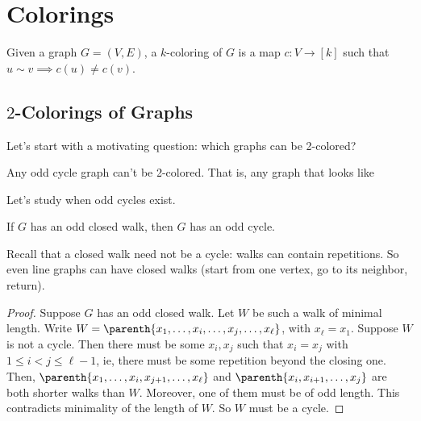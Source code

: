 \section{Colorings}

\begin{boxdefinition}[Coloring]
    Given a graph $G = (V, E)$, a $k$-coloring of $G$ is a map $c : V \to [k]$ such that $u \sim v \implies c(u) \ne c(v)$.
\end{boxdefinition}

\subsection{$2$-Colorings of Graphs}

Let's start with a motivating question: which graphs can be 2-colored?

Any odd cycle graph can't be 2-colored. That is, any graph that looks like
\begin{figure}[H]
    \centering
\end{figure}

Let's study when odd cycles exist.

\begin{boxlemma}\label{Ch2:Lemma:Odd_Closed_Walk}
    If $G$ has an odd closed walk, then $G$ has an odd cycle.
\end{boxlemma}
Recall that a closed walk need not be a cycle: walks can contain repetitions. So even line graphs can have closed walks (start from one vertex, go to its neighbor, return).
\begin{proof}
    Suppose $G$ has an odd closed walk. Let $W$ be such a walk of minimal length. Write $W = \parenth{x_1, \ldots, x_i, \ldots, x_j, \ldots, x_{\ell}}$, with $x_{\ell} = x_1$. Suppose $W$ is not a cycle. Then there must be some $x_i, x_j$ such that $x_i = x_j$ with $1 \leq i < j \leq \ell - 1$, ie, there must be some repetition beyond the closing one. Then, $\parenth{x_1, \ldots, x_i, x_{j+1}, \ldots, x_{\ell}}$ and $\parenth{x_i, x_{i+1}, \ldots, x_{j}}$ are both shorter walks than $W$. Moreover, one of them must be of odd length. This contradicts minimality of the length of $W$. So $W$ must be a cycle.
\end{proof}

